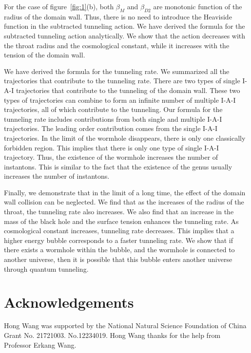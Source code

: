 \documentclass[12pt]{article}
\begin{document}
For the case of figure~\ref{fig:1}(b), both $\beta_{M}$ and $\beta_{D2}$ are monotonic function of the radius of the domain wall. Thus, there is no need to introduce the Heaviside function in the subtracted tunneling action. We have derived the formula for the subtracted tunneling action analytically. We show that the action decreases with the throat radius and the cosmological constant, while it increases with the  tension of the domain wall.

We have derived the formula for the tunneling rate. We summarized all the trajectories that contribute to the tunneling rate. There are two types of single I-A-I trajectories that contribute to the tunneling of the domain wall. These two types of trajectories can combine to form an infinite number of multiple I-A-I trajectories, all of which contribute to the tunneling. Our formula for the tunneling rate includes contributions from both single and multiple I-A-I trajectories. The leading order contribution comes from the single I-A-I trajectories. In the limit of the wormhole disappears, there is only one classically forbidden region. This implies that there is only one type of single I-A-I trajectory. Thus, the existence of the wormhole increases the number of instantons.  This is similar to the fact that the existence of the genus usually increases the number of instantons.

Finally, we demonstrate that in the limit of a long time, the effect of the domain wall collision can be neglected. We find that as the increases of the radius of the throat, the tunneling rate also increases. We also find that an increase in the mass of the black hole and the surface tension  enhances the tunneling rate. As cosmological constant increases, tunneling rate decreases.  This implies that a higher energy bubble corresponds to a faster tunneling rate. We show that if there exists a wormhole within the bubble, and the wormhole is connected to another universe, then it is possible that this bubble enters another universe through quantum tunneling.



\section*{Acknowledgements}
Hong Wang  was supported by the National Natural Science Foundation of China Grant No. 21721003.  No.12234019. Hong Wang thanks for the help from Professor Erkang Wang.
\end{document}
